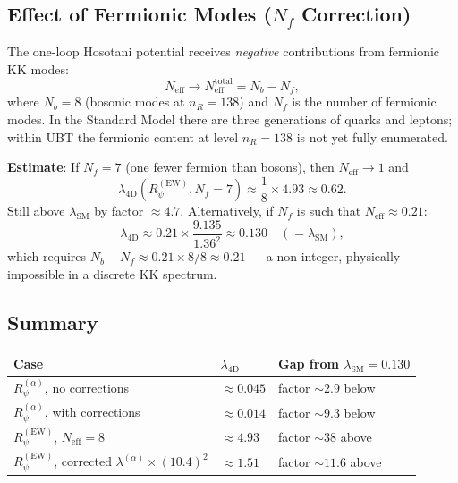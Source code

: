 \documentclass[12pt]{article}
\theoremstyle{definition}
\theoremstyle{remark}
\begin{document}
\subsection{Effect of Fermionic Modes ($N_f$ Correction)}

The one-loop Hosotani potential receives \emph{negative} contributions
from fermionic KK modes:
\begin{equation}
  N_{\text{eff}} \to N_{\text{eff}}^{\text{total}} = N_b - N_f,
  \label{eq:Neff_with_fermions}
\end{equation}
where $N_b = 8$ (bosonic modes at $n_R = 138$) and $N_f$ is the number
of fermionic modes.  In the Standard Model there are three generations
of quarks and leptons; within UBT the fermionic content at level $n_R = 138$
is not yet fully enumerated.

\textbf{Estimate}: If $N_f = 7$ (one fewer fermion than bosons), then
$N_{\text{eff}} \to 1$ and
\begin{equation}
  \lambda_{\text{4D}}(R_\psi^{(\text{EW})}, N_f=7)
  \approx \frac{1}{8} \times 4.93 \approx 0.62.
\end{equation}
Still above $\lambda_{\text{SM}}$ by factor $\approx 4.7$.  Alternatively,
if $N_f$ is such that $N_{\text{eff}} \approx 0.21$:
\begin{equation}
  \lambda_{\text{4D}} \approx 0.21 \times \frac{9.135}{1.36^2} \approx 0.130
  \quad (= \lambda_{\text{SM}}),
\end{equation}
which requires $N_b - N_f \approx 0.21 \times 8 / 8 \approx 0.21$ — a
non-integer, physically impossible in a discrete KK spectrum.

\subsection{Summary}

\begin{center}
\begin{tabular}{|l|l|l|}
\hline
\textbf{Case} & $\lambda_{\text{4D}}$ & \textbf{Gap from $\lambda_{\text{SM}}=0.130$} \\
\hline
$R_\psi^{(\alpha)}$, no corrections & $\approx 0.045$ & factor $\sim 2.9$ below \\
$R_\psi^{(\alpha)}$, with corrections & $\approx 0.014$ & factor $\sim 9.3$ below \\
$R_\psi^{(\text{EW})}$, $N_{\text{eff}}=8$ & $\approx 4.93$ & factor $\sim 38$ above \\
$R_\psi^{(\text{EW})}$, corrected $\lambda^{(\alpha)} \times (10.4)^2$ & $\approx 1.51$ & factor $\sim 11.6$ above \\
\hline
\end{tabular}
\end{center}
\end{document}
